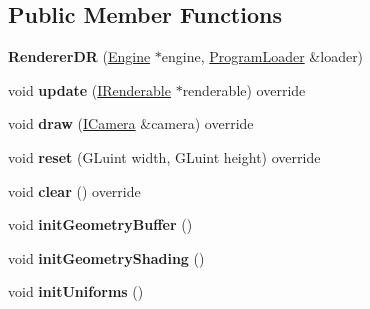 \subsection*{Public Member Functions}
\begin{DoxyCompactItemize}
\item 
{\bfseries Renderer\+DR} (\hyperlink{classflw_1_1Engine}{Engine} $\ast$engine, \hyperlink{classflw_1_1flf_1_1ProgramLoader}{Program\+Loader} \&loader)\hypertarget{classflw_1_1flf_1_1RendererDR_aebaffd8158ea906753c476b228153572}{}\label{classflw_1_1flf_1_1RendererDR_aebaffd8158ea906753c476b228153572}

\item 
void {\bfseries update} (\hyperlink{classflw_1_1flf_1_1IRenderable}{I\+Renderable} $\ast$renderable) override\hypertarget{classflw_1_1flf_1_1RendererDR_af24a94504ff0bbec00843bf6027f3fbb}{}\label{classflw_1_1flf_1_1RendererDR_af24a94504ff0bbec00843bf6027f3fbb}

\item 
void {\bfseries draw} (\hyperlink{classflw_1_1flf_1_1ICamera}{I\+Camera} \&camera) override\hypertarget{classflw_1_1flf_1_1RendererDR_a90ce736663478130acc605e4f6378769}{}\label{classflw_1_1flf_1_1RendererDR_a90ce736663478130acc605e4f6378769}

\item 
void {\bfseries reset} (G\+Luint width, G\+Luint height) override\hypertarget{classflw_1_1flf_1_1RendererDR_af915da21688fac75e2957ea57c8442bc}{}\label{classflw_1_1flf_1_1RendererDR_af915da21688fac75e2957ea57c8442bc}

\item 
void {\bfseries clear} () override\hypertarget{classflw_1_1flf_1_1RendererDR_a06b7d4179472c7040484693cabfeeb8d}{}\label{classflw_1_1flf_1_1RendererDR_a06b7d4179472c7040484693cabfeeb8d}

\item 
void {\bfseries init\+Geometry\+Buffer} ()\hypertarget{classflw_1_1flf_1_1RendererDR_a677affaaf7a64b8a68c593f520f43497}{}\label{classflw_1_1flf_1_1RendererDR_a677affaaf7a64b8a68c593f520f43497}

\item 
void {\bfseries init\+Geometry\+Shading} ()\hypertarget{classflw_1_1flf_1_1RendererDR_a893839e02336a751c8d5ff0451e526cc}{}\label{classflw_1_1flf_1_1RendererDR_a893839e02336a751c8d5ff0451e526cc}

\item 
void {\bfseries init\+Uniforms} ()\hypertarget{classflw_1_1flf_1_1RendererDR_a459281e950903ca0b4d31d250684ce51}{}\label{classflw_1_1flf_1_1RendererDR_a459281e950903ca0b4d31d250684ce51}


\end{DoxyCompactItemize}
